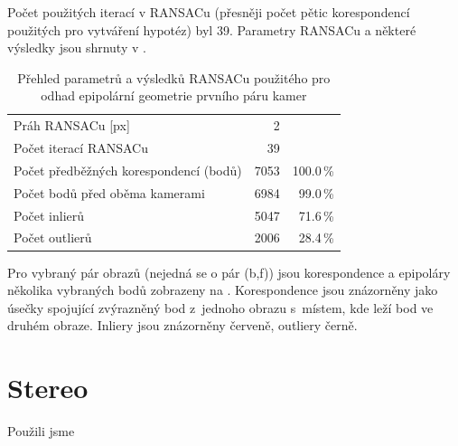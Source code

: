 \documentclass[11pt,oneside,a4paper,pdftex]{article}   %
\begin{document}
		Počet použitých iterací v RANSACu (přesněji počet pětic korespondencí použitých pro vytváření
		hypotéz) byl 39. Parametry RANSACu a některé výsledky jsou shrnuty v
		.
		
			\begin{table}[h]
				\centering
				\begin{tabular}{|lrr|}
					\hline
					Práh RANSACu [px]				& 2		&	\\
					Počet iterací RANSACu			& 39	&	\\
					Počet předběžných korespondencí (bodů)		& 7053	& 100.0\,\%	\\
					Počet bodů před oběma kamerami	& 6984	& 99.0\,\%	\\
					Počet inlierů					& 5047	& 71.6\,\%	\\
					Počet outlierů					& 2006	& 28.4\,\%	\\
					\hline
				\end{tabular}
				\caption{Přehled parametrů a výsledků RANSACu použitého pro odhad epipolární geometrie
					prvního páru kamer}
				\label{tabFirstPairEEstimate}
			\end{table}

		Pro vybraný pár obrazů (nejedná se o pár (b,f)) jsou korespondence a epipoláry ně\-ko\-li\-ka
		vy\-bra\-ných
		bodů zobrazeny na . Korespondence jsou znázorněny jako úsečky
		spo\-ju\-jí\-cí zvýrazněný bod z~jednoho obrazu s~místem, kde leží bod ve druhém obraze. Inliery jsou
		znázorněny červeně, outliery černě.
		
	
	
		
	
\section{Stereo}
	
	Použili jsme \cite{Cech-BenCOS-CVPR-2007}

	
\end{document}
